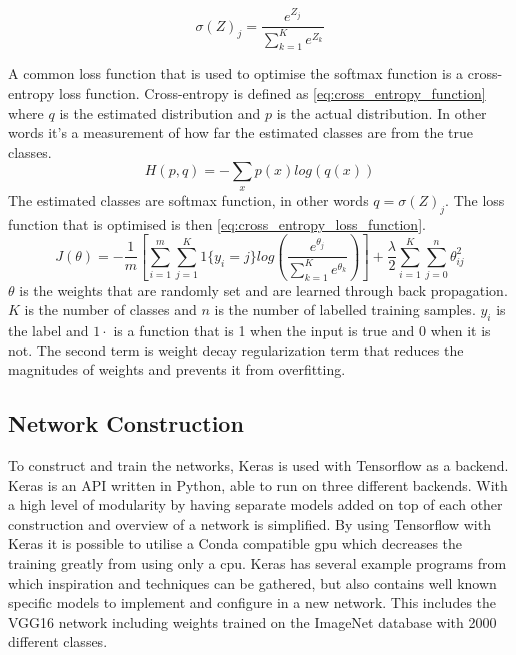 \begin{equation}
\label{eq:softmax_activation_function}
\sigma(Z)_{j} = \frac{e^{Z_j}}{\sum_{k=1}^{K}e^{Z_k}}
\end{equation}

A common loss function that is used to optimise the softmax function is a cross-entropy loss function. Cross-entropy is defined as \autoref{eq:cross_entropy_function} where $q$ is the estimated distribution and $p$ is the actual distribution. In other words it's a measurement of how far the estimated classes are from the true classes.
\begin{equation}
\label{eq:cross_entropy_function}
H(p,q) = -\sum_{x}p(x)log(q(x))
\end{equation}
The estimated classes are softmax function, in other words $q = \sigma(Z)_{j} $. The loss function that is optimised is then \autoref{eq:cross_entropy_loss_function}.
\begin{equation}
\label{eq:cross_entropy_loss_function}
J(\theta) = -\frac{1}{m}\left[ \sum_{i=1}^{m}\sum_{j=1}^{K} 1\{y_i=j\}  log\left( \frac{e^{\theta_j}}{\sum_{k=1}^{K}e^{\theta_k}} \right)\right] + \frac{\lambda}{2} \sum_{i=1}^{K} \sum_{j=0}^{n} \theta_{ij}^{2}
\end{equation}
$\theta$ is the weights that are randomly set and are learned through back propagation. $K$ is the number of classes and $n$ is the number of labelled training samples. $y_i$ is the label and $1{\cdot}$ is a function that is 1 when the input is true and 0 when it is not. The second term is weight decay regularization term that reduces the magnitudes of weights and prevents it from overfitting.


\subsection{Network Construction}
To construct and train the networks, Keras is used with Tensorflow as a backend. Keras is an API written in Python, able to run on three different backends. With a high level of modularity by having separate models added on top of each other construction and overview of a network is simplified. By using Tensorflow with Keras it is possible to utilise a Conda compatible \gls{gpu} which decreases the training greatly from using only a \gls{cpu}. Keras has several example programs from which inspiration and techniques can be gathered, but also contains well known specific models to implement and configure in a new network. This includes the VGG16 network including weights trained on the ImageNet database with 2000 different classes.




